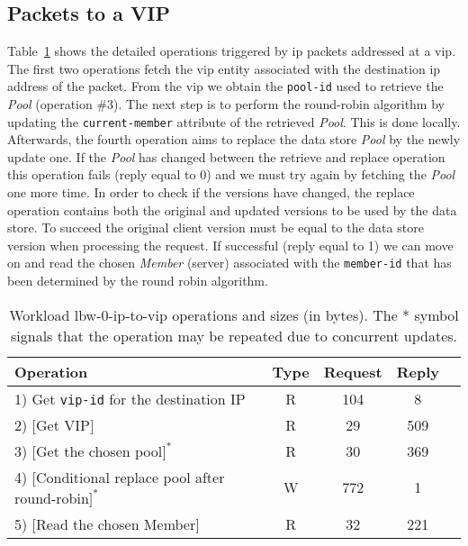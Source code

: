 \subsection{Packets to a VIP}
Table~\ref{table:lbw-0-ip-to-vip} shows the detailed operations triggered by \gls{ip}  packets addressed at a \gls{vip}. 
The first two operations fetch the \gls{vip} entity associated with the destination \gls{ip} address of the packet. 
From the \gls{vip} we obtain the \texttt{pool-id} used to retrieve the \emph{Pool} (operation \#3). 
The next step is to perform the round-robin algorithm by updating the \texttt{current-member} attribute of the retrieved \emph{Pool}. 
This is done locally. 
Afterwards, the fourth operation aims to replace the data store \emph{Pool} by the newly update one. 
If the \emph{Pool} has changed between the retrieve and replace operation this operation fails (reply equal to 0) and we must try again by fetching the \emph{Pool} one more time. In order to check if the versions have changed, the replace operation contains both the original and updated versions to be used by the data store. 
To succeed the original client version must be equal to the data store version when processing the request.
If successful (reply equal to 1) we can move on and read the chosen \emph{Member} (server) associated with the \texttt{member-id}  that has been determined by the round robin algorithm. 

\begin{table}[ht]
\small
\centering 
\begin{tabular}{l c c c c}
 Operation & Type & Request & Reply \\ \toprule 
1) Get \texttt{vip-id} for the destination IP & R & 104 & 8\\
2) $[$Get VIP$]$ & R & 29 & 509\\
3) $[$Get the chosen pool$]^*$ & R & 30 & 369\\
4) $[$Conditional replace pool after round-robin$]^*$ & W & 772 & 1\\
5) $[$Read the chosen Member$]$ & R & 32 & 221 \\ \bottomrule
\end{tabular}\caption[Workload lbw-0-ip-to-vip operations]{Workload lbw-0-ip-to-vip operations
  and sizes (in bytes). The * symbol signals that the operation may be repeated due to concurrent updates.}
\label{table:lbw-0-ip-to-vip}
\end{table}

